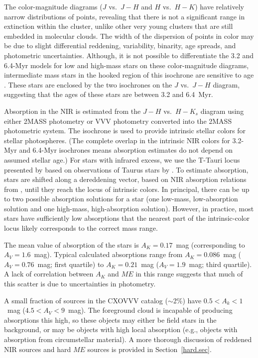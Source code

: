 \documentclass[twocolumn,tighten]{aastex61}
\begin{document}
 The color-magnitude diagrams ($J$ vs.\ $J-H$ and $H$ vs.\ $H-K$) have relatively narrow distributions of points, revealing that there is not a significant range in extinction within the cluster, unlike other very young clusters that are still embedded in molecular clouds. The width of the dispersion of points in color may be due to slight differential reddening, variability, binarity, age spreads, and photometric uncertainties. 
Although, it is not possible to differentiate the 3.2 and 6.4-Myr models for low and high-mass stars on these color-magnitude diagrams, intermediate mass stars in the hooked region of this isochrone are sensitive to age \citep{2013AJ....145...46L}. These stars are enclosed by the two isochrones on the $J$ vs.\ $J-H$ diagram, suggesting that the ages of these stars are between 3.2 and 6.4~Myr.


Absorption in the NIR is estimated from the $J-H$ vs.\ $H-K_s$ diagram using either 2MASS photometry or VVV photometry converted into the 2MASS photometric system. The \citet{2000A&A...358..593S} isochrone is used to provide intrinsic stellar colors for stellar photospheres. (The complete overlap in the intrinsic NIR colors for 3.2-Myr and 6.4-Myr isochrones means absorption estimates do not depend on assumed stellar age.) For stars with infrared excess, we use the T-Tauri locus presented by \citet{2014ApJ...787..108G} based on observations of Taurus stars by \citet{2010ApJS..186..111L}. To estimate absorption, stars are shifted along a dereddening vector, based on NIR absorption relations from \citet{1985ApJ...288..618R}, until they reach the locus of intrinsic colors. In principal, there can be up to two possible absorption solutions for a star (one low-mass, low-absorption solution and one high-mass, high-absorption solution). However, in practice, most stars have sufficiently low absorptions that the nearest part of the intrinsic-color locus likely corresponds to the correct mass range.

The mean value of absorption of the stars is $A_K=0.17$~mag (corresponding to $A_V=1.6$~mag). Typical calculated absorptions range from $A_K=0.086$~mag ($A_V=0.76$~mag; first quartile) to $A_K=0.21$~mag ($A_V=1.9$~mag; third quartile). A lack of correlation between $A_K$ and $ME$ in this range suggests that much of this scatter is due to uncertainties in photometry. 

A small fraction of sources in the CXOVVV catalog ($\sim$2\%) have $0.5<A_k<1$~mag ($4.5<A_V<9$~mag). The foreground cloud is incapable of producing absorptions this high, so these objects may either be field stars in the background, or may be objects with high local absorption (e.g., objects with absorption from circumstellar material). A more thorough discussion of reddened NIR sources and hard $ME$ sources is provided in Section~\ref{hard.sec}. 
\end{document}
